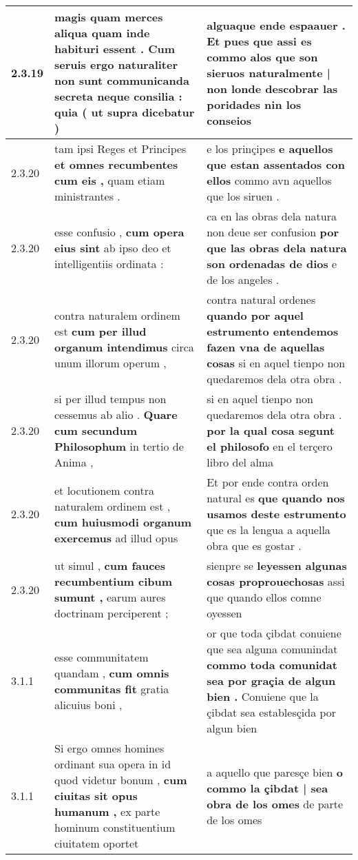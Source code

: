 \begin{tabular}{|p{1cm}|p{6.5cm}|p{6.5cm}|}
2.3.19 & magis quam merces aliqua quam inde habituri essent . \textbf{ Cum seruis ergo naturaliter non sunt communicanda secreta neque consilia : } quia ( ut supra dicebatur ) & alguaque ende espaauer . \textbf{ Et pues que assi es commo alos que son sieruos naturalmente | non londe descobrar las poridades } nin los conseios \\\hline
2.3.20 & tam ipsi Reges et Principes \textbf{ et omnes recumbentes cum eis , } quam etiam ministrantes . & e los prinçipes \textbf{ e aquellos que estan assentados con ellos } commo avn aquellos que los siruen . \\\hline
2.3.20 & esse confusio , \textbf{ cum opera eius sint } ab ipso deo et intelligentiis ordinata : & ca en las obras dela natura non deue ser confusion \textbf{ por que las obras dela natura son ordenadas de dios } e de los angeles . \\\hline
2.3.20 & contra naturalem ordinem est \textbf{ cum per illud organum intendimus } circa unum illorum operum , & contra natural ordenes \textbf{ quando por aquel estrumento entendemos fazen vna de aquellas cosas } si en aquel tienpo non quedaremos dela otra obra . \\\hline
2.3.20 & si per illud tempus non cessemus ab alio . \textbf{ Quare cum secundum Philosophum } in tertio de Anima , & si en aquel tienpo non quedaremos dela otra obra . \textbf{ por la qual cosa segunt el philosofo } en el terçero libro del alma \\\hline
2.3.20 & et locutionem contra naturalem ordinem est , \textbf{ cum huiusmodi organum exercemus } ad illud opus & Et por ende contra orden natural es \textbf{ que quando nos usamos deste estrumento } que es la lengua a aquella obra que es gostar . \\\hline
2.3.20 & ut simul , \textbf{ cum fauces recumbentium cibum sumunt , } earum aures doctrinam perciperent ; & sienpre se \textbf{ leyessen algunas cosas proprouechosas } assi que quando ellos comne oyessen \\\hline
3.1.1 & esse communitatem quandam , \textbf{ cum omnis communitas fit } gratia alicuius boni , & or que toda çibdat conuiene que sea alguna comunindat \textbf{ commo toda comunidat sea por graçia de algun bien . } Conuiene que la çibdat sea establesçida por algun bien \\\hline
3.1.1 & Si ergo omnes homines ordinant sua opera in id quod videtur bonum , \textbf{ cum ciuitas sit opus humanum , } ex parte hominum constituentium ciuitatem oportet & a aquello que paresçe bien \textbf{ o commo la çibdat | sea obra de los omes } de parte de los omes \\\hline

\end{tabular}
